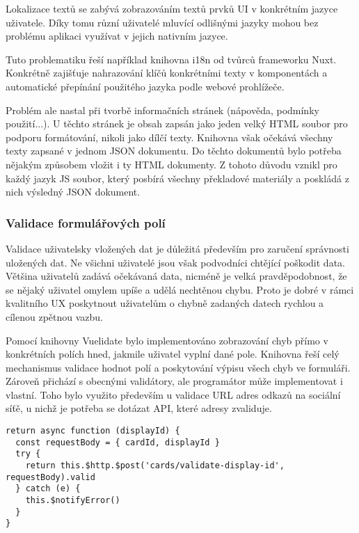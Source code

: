		Lokalizace textů se zabývá zobrazováním textů prvků \ac{UI} v konkrétním jazyce uživatele.
		Díky tomu různí uživatelé mluvící odlišnými jazyky mohou bez problému aplikaci využívat v jejich nativním jazyce.

		Tuto problematiku řeší například knihovna i18n od tvůrců frameworku Nuxt.
		Konkrétně zajišťuje nahrazování klíčů konkrétními texty v komponentách a automatické přepínání použitého jazyka
		podle webové prohlížeče.

		Problém ale nastal při tvorbě informačních stránek (nápověda, podmínky použití...).
		U těchto stránek je obsah zapsán jako jeden velký \ac{HTML} soubor pro podporu formátování, nikoli
		jako dílčí texty.
		Knihovna však očekává všechny texty zapsané v jednom \ac{JSON} dokumentu.
		Do těchto dokumentů bylo potřeba nějakým způsobem vložit i ty \ac{HTML} dokumenty.
		Z tohoto důvodu vznikl pro každý jazyk \ac{JS} soubor, který posbírá všechny překladové materiály a poskládá z nich
		výsledný \ac{JSON} dokument.

		\subsubsection{Validace formulářových polí}

		Validace uživatelsky vložených dat je důležitá především pro zaručení správnosti uložených dat.
		Ne všichni uživatelé jsou však podvodníci chtějící poškodit data.
		Většina uživatelů zadává očekávaná data, nicméně je velká pravděpodobnost, že se nějaký uživatel omylem upíše
		a udělá nechtěnou chybu.
		Proto je dobré v rámci kvalitního \ac{UX} poskytnout uživatelům o chybně zadaných datech rychlou a cílenou zpětnou vazbu.


		Pomocí knihovny Vuelidate bylo implementováno zobrazování chyb přímo v konkrétních polích hned,
		jakmile uživatel vyplní dané pole.
		Knihovna řeší celý mechanismus validace hodnot polí a poskytování výpisu všech chyb ve formuláři.
		Zároveň přichází s obecnými validátory, ale programátor může implementovat i vlastní.
		Toho bylo využito především u validace \ac{URL} adres odkazů na sociální síťě, u nichž je potřeba se dotázat \ac{API},
		které adresy zvaliduje.

		\begin{codeblock}
			\begin{verbatim}
return async function (displayId) {
  const requestBody = { cardId, displayId }
  try {
    return this.$http.$post('cards/validate-display-id', requestBody).valid
  } catch (e) {
    this.$notifyError()
  }
}
			\end{verbatim}
		\end{codeblock}


